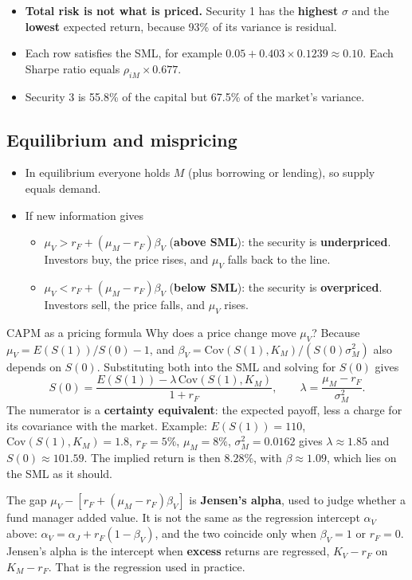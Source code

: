 \documentclass[titlepage,11pt,a4paper]{article}
\newcommand{\Cov}{\mathrm{Cov}}
\newcommand{\E}{E}
\begin{document}
\begin{itemize}
  \item \textbf{Total risk is not what is priced.} Security 1 has the \textbf{highest} $\sigma$ and the \textbf{lowest} expected return, because 93\% of its variance is residual.
  \item Each row satisfies the SML, for example $0.05+0.403\times0.1239\approx0.10$. Each Sharpe ratio equals $\rho_{iM}\times0.677$.
  \item Security 3 is 55.8\% of the capital but 67.5\% of the market's variance.
\end{itemize}

\subsection{Equilibrium and mispricing}
\begin{itemize}
  \item In equilibrium everyone holds $M$ (plus borrowing or lending), so supply equals demand.
  \item If new information gives
  \begin{itemize}
    \item $\mu_V>r_F+(\mu_M-r_F)\beta_V$ (\textbf{above SML}): the security is \textbf{underpriced}. Investors buy, the price rises, and $\mu_V$ falls back to the line.
    \item $\mu_V<r_F+(\mu_M-r_F)\beta_V$ (\textbf{below SML}): the security is \textbf{overpriced}. Investors sell, the price falls, and $\mu_V$ rises.
  \end{itemize}
\end{itemize}

\begin{deeper}{CAPM as a pricing formula}
Why does a price change move $\mu_V$? Because $\mu_V=\E(S(1))/S(0)-1$, and $\beta_V=\Cov(S(1),K_M)/(S(0)\sigma_M^2)$ also depends on $S(0)$. Substituting both into the SML and solving for $S(0)$ gives
\[S(0)=\frac{\E(S(1))-\lambda\,\Cov(S(1),K_M)}{1+r_F},\qquad\lambda=\frac{\mu_M-r_F}{\sigma_M^2}.\]
The numerator is a \textbf{certainty equivalent}: the expected payoff, less a charge for its covariance with the market. Example: $\E(S(1))=110$, $\Cov(S(1),K_M)=1.8$, $r_F=5\%$, $\mu_M=8\%$, $\sigma_M^2=0.0162$ gives $\lambda\approx1.85$ and $S(0)\approx101.59$. The implied return is then $8.28\%$, with $\beta\approx1.09$, which lies on the SML as it should.
\end{deeper}

\begin{practice}
The gap $\mu_V-[r_F+(\mu_M-r_F)\beta_V]$ is \textbf{Jensen's alpha}, used to judge whether a fund manager added value. It is not the same as the regression intercept $\alpha_V$ above: $\alpha_V=\alpha_J+r_F(1-\beta_V)$, and the two coincide only when $\beta_V=1$ or $r_F=0$. Jensen's alpha is the intercept when \textbf{excess} returns are regressed, $K_V-r_F$ on $K_M-r_F$. That is the regression used in practice.
\end{practice}
\end{document}
